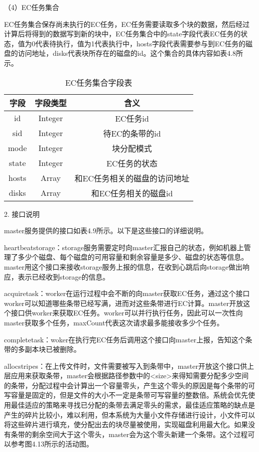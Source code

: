（4）EC任务集合

EC任务集合保存尚未执行的EC任务，EC任务需要读取多个块的数据，然后经过计算后将得到的数据写到新的块中，EC任务集合中的state字段代表EC任务的状态，值为0代表待执行，值为1代表执行中，hosts字段代表需要参与到EC任务的磁盘的访问地址，disks代表块所存在的磁盘的id。这个集合的具体内容如表4.8所示。

\begin{table}[h]
    \centering
    \caption{EC任务集合字段表}
    \begin{tabular}{ccc}
      \toprule
      字段   & 字段类型   & 含义                          \\
      \midrule
      id     & Integer & EC任务id                 \\
      sid    & Integer & 待EC的条带的id                \\
      mode   & Integer & 块分配模式                 \\
      state  & Integer & EC任务的状态                \\
      hosts  & Array   & 和EC任务相关的磁盘的访问地址  \\
      disks  & Array   & 和EC任务相关的磁盘id         \\
      \bottomrule
    \end{tabular}
\end{table}

2. 接口说明

master服务提供的接口如表4.9所示。以下是这些接口的详细说明。

heartbeatstorage：storage服务需要定时向master汇报自己的状态，例如机器上管理了多少个磁盘、每个磁盘的可用容量和剩余容量是多少、磁盘的状态等信息。master用这个接口来接收storage服务上报的信息，在收到心跳后向storage做出响应，表示已经收到storage的信息。

acquiretask：worker在运行过程中会不断的向master获取EC任务，通过这个接口worker可以知道哪些条带已经写满，进而对这些条带进行EC计算。master开放这个接口供worker来获取EC任务。worker可以并行执行任务，因此可以一次性向master获取多个任务，maxCount代表这次请求最多能接收多少个任务。

completetask：woker在执行完EC任务后调用这个接口向master上报，告知这个条带的多副本块已被删除。

allocstripes：在上传文件时，文件需要被写入到条带中，master开放这个接口供上层应用来获取条带，master会根据路径参数中的<size>来得知需要分配多少空间的条带，分配过程中会计算出一个容量零头，产生这个零头的原因是每个条带的可写容量是固定的，但是文件的大小不一定是条带可写容量的整数倍。系统会优先使用最佳适应的策略来寻找已分配的条带去满足零头的需求，最佳适应策略的缺点是产生的碎片比较小，难以利用，但本系统为大量小文件存储进行设计，小文件可以将这些碎片进行填充，使分配出去的块尽量被使用，实现磁盘利用最大化。如果没有条带的剩余空间大于这个零头，master会为这个零头新建一个条带。这个过程可以参考图4.13所示的活动图。

